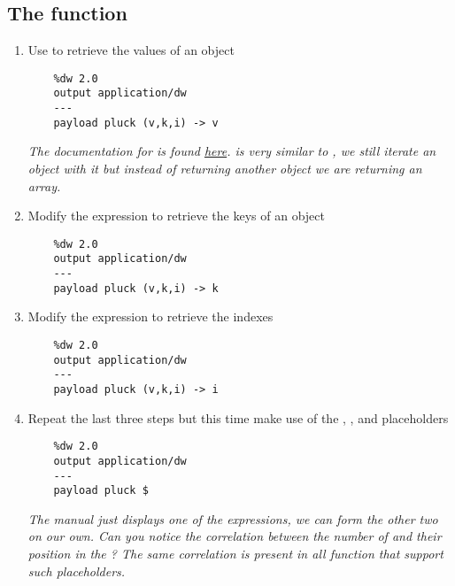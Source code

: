\subsection{The  function}
\begin{enumerate}[resume*]
\item Use  to retrieve the values of an object
  \begin{lstlisting}
    %dw 2.0
    output application/dw
    ---
    payload pluck (v,k,i) -> v
  \end{lstlisting}
  \emph{
    The documentation for  is found \href{https://docs.mulesoft.com/mule-runtime/4.3/dw-core-functions-pluck}{here}.   is very similar to , we still iterate an object with it but instead of returning another object we are returning an array.
  }
\item Modify the expression to retrieve the keys of an object
  \begin{lstlisting}
    %dw 2.0
    output application/dw
    ---
    payload pluck (v,k,i) -> k
  \end{lstlisting}
\item Modify the expression to retrieve the indexes
  \begin{lstlisting}
    %dw 2.0
    output application/dw
    ---
    payload pluck (v,k,i) -> i
  \end{lstlisting}
\item Repeat the last three steps but this time make use of the \ttt{\$}, \ttt{\$\$}, and \ttt{\$\$\$} placeholders
  \begin{lstlisting}
    %dw 2.0
    output application/dw
    ---
    payload pluck $
  \end{lstlisting}
  \emph{
    The manual just displays one of the expressions, we can form the other two on our own.
    \newline
    Can you notice the correlation between the number of \ttt{\$} and their position in the \les{}?  The same correlation is present in all function that support such placeholders.
  }
\end{enumerate}

